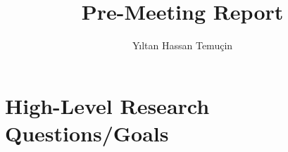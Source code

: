 \documentclass{article}
\begin{document}
\frontmatter
  \title{Pre-Meeting Report}
  \author{Y{\i}ltan Hassan Temu\c{c}in}
  \maketitle
  \tableofcontents
  \mainmatter

  \section{High-Level Research Questions/Goals}

%  
%  
\end{document}
